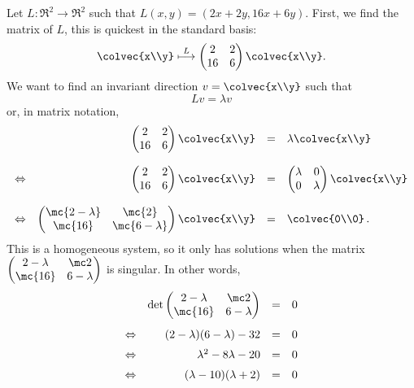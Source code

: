 
\begin{example}
Let $L \colon \Re^2\rightarrow \Re^2$ such that $L(x,y)=(2x+2y, 16x+6y)$.  First, we  find the matrix of $L$, this is quickest in the standard basis:
\[
\colvec{x\\y}\stackrel{L}{\longmapsto} \begin{pmatrix}
2 & 2 \\
16 & 6
\end{pmatrix}\colvec{x\\y}.
\]
We want to find an invariant direction $v=\colvec{x\\y}$ such that
\[
Lv=\lambda v
\]
or, in matrix notation,
\begin{equation*}
\begin{array}{lrcl}
&\begin{pmatrix}
2 & 2 \\
16 & 6
\end{pmatrix}\colvec{x\\y}&=&\lambda \colvec{x\\y} \\[6mm]
\Leftrightarrow &\begin{pmatrix}
2 & 2 \\
16 & 6
\end{pmatrix}\colvec{x\\y}&=&\begin{pmatrix}
\lambda & 0 \\
0 & \lambda
\end{pmatrix} \colvec{x\\y} \\[6mm] 
\Leftrightarrow& 
\begin{pmatrix}
\mc{2-\lambda} & \mc{2} \\
\mc{16} & \mc{6-\lambda}
\end{pmatrix}\colvec{x\\y}&=& \colvec{0\\0}\, .
\end{array}
\end{equation*}
This is a homogeneous system, so it only has solutions when the matrix $\begin{pmatrix}
2-\lambda & \mc2 \\
\mc{16} & 6-\lambda
\end{pmatrix}$ is singular.  In other words, 
\begin{equation*}
\begin{array}{lrcl}
&\det \begin{pmatrix}
2-\lambda & \mc2 \\
\mc{16} & 6-\lambda
\end{pmatrix}&=&0 \\[5mm]
\Leftrightarrow& (2-\lambda)(6-\lambda)-32&=&0 \\[2mm]
\Leftrightarrow &\lambda^2-8\lambda-20&=&0\\[2mm]
\Leftrightarrow &(\lambda-10)(\lambda+2)&=&0
\end{array}
\end{equation*}


\end{example}
